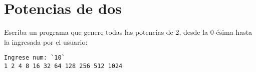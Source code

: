 \section{Potencias de dos}

Escriba un programa que genere todas las potencias de 2, desde la
0-ésima hasta la ingresada por el usuario:

\begin{lstlisting}[language=testcase]
Ingrese num: `10`
1 2 4 8 16 32 64 128 256 512 1024
\end{lstlisting}

